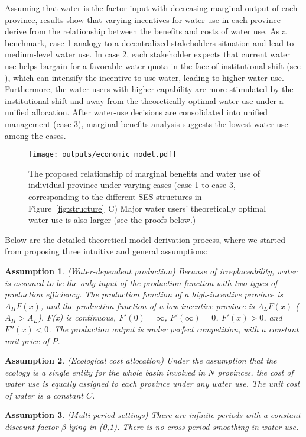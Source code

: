 \documentclass[preprint, 12pt]{elsarticle}
\newtheorem{ass}{Assumption}
\begin{document}
Assuming that water is the factor input with decreasing marginal output of each province, results show that varying incentives for water use in each province derive from the relationship between the benefits and costs of water use.
As a benchmark, case 1 analogy to a decentralized stakeholders situation and lead to medium-level water use.
In case 2, each stakeholder expects that current water use helps bargain for a favorable water quota in the face of institutional shift (see \textit{}), which can intensify the incentive to use water, leading to higher water use.
Furthermore, the water users with higher capability are more stimulated by the institutional shift and away from the theoretically optimal water use under a unified allocation.
After water-use decisions are consolidated into unified management (case 3), marginal benefits analysis suggests the lowest water use among the cases.


\begin{figure}[!htb]
	\centering
	\texttt{[image: outputs/economic\_model.pdf]}
	\caption{
		The proposed relationship of marginal benefits and water use of individual province under varying cases (case 1 to case 3, corresponding to the different SES structures in Figure~\ref{fig:structure}~C) Major water users' theoretically optimal water use is also larger (see the proofs below.)}
\end{figure}

Below are the detailed theoretical model derivation process, where we started from proposing three intuitive and general assumptions:

\begin{ass}
(Water-dependent production) Because of irreplaceability, water is assumed to be the only input of the production function with two types of production efficiency. The production function of a high-incentive province is $A_HF(x)$, and the production function of a low-incentive province is $A_LF(x)$ ($A_H>A_L$). F(x) is continuous, $F'(0)=\infty$, $ F'(\infty)=0$, $F'(x)>0$, and $F''(x)<0$. The production output is under perfect competition, with a constant unit price of $P$.
\end{ass}

\begin{ass}
 (Ecological cost allocation) Under the assumption that the ecology is a single entity for the whole basin involved in $N$ provinces, the cost of water use is equally assigned to each province under any water use. The unit cost of water is a constant $C$.
\end{ass}
\begin{ass}
(Multi-period settings) There are infinite periods with a constant discount factor $\beta$ lying in (0,1). There is no cross-period smoothing in water use.
\end{ass}
\end{document}
